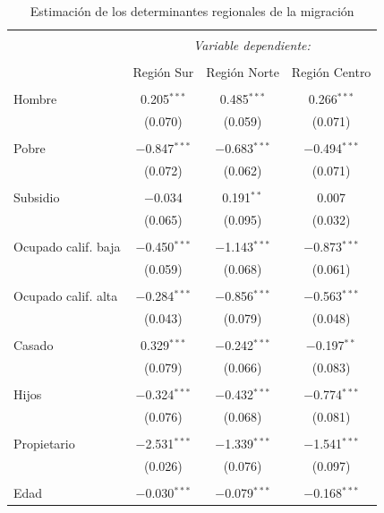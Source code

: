 \documentclass[12pt,a4paper]{article}
\begin{document}
\begin{table}[!htbp] \centering \footnotesize 
  \caption{Estimación de los determinantes regionales de la migración} 
  \label{cuadro:estimacion_regional} 
\begin{tabular}{@{\extracolsep{5pt}}lccc} 
\\[-1.8ex]\hline 
\hline \\[-1.8ex] 
 & \multicolumn{3}{c}{\textit{Variable dependiente:}} \\ 
\cline{2-4} 
\\[-1.8ex] & Región Sur & Región Norte & Región Centro \\ 
\hline \\[-1.8ex] 
 Hombre & 0.205$^{***}$ & 0.485$^{***}$ & 0.266$^{***}$ \\ 
  & (0.070) & (0.059) & (0.071) \\ 
  & & & \\ 
 Pobre & $-$0.847$^{***}$ & $-$0.683$^{***}$ & $-$0.494$^{***}$ \\ 
  & (0.072) & (0.062) & (0.071) \\ 
  & & & \\ 
 Subsidio & $-$0.034 & 0.191$^{**}$ & 0.007 \\ 
  & (0.065) & (0.095) & (0.032) \\ 
  & & & \\ 
 Ocupado calif. baja & $-$0.450$^{***}$ & $-$1.143$^{***}$ & $-$0.873$^{***}$ \\ 
  & (0.059) & (0.068) & (0.061) \\ 
  & & & \\ 
 Ocupado calif. alta & $-$0.284$^{***}$ & $-$0.856$^{***}$ & $-$0.563$^{***}$ \\ 
  & (0.043) & (0.079) & (0.048) \\ 
  & & & \\ 
 Casado & 0.329$^{***}$ & $-$0.242$^{***}$ & $-$0.197$^{**}$ \\ 
  & (0.079) & (0.066) & (0.083) \\ 
  & & & \\ 
 Hijos & $-$0.324$^{***}$ & $-$0.432$^{***}$ & $-$0.774$^{***}$ \\ 
  & (0.076) & (0.068) & (0.081) \\ 
  & & & \\ 
 Propietario & $-$2.531$^{***}$ & $-$1.339$^{***}$ & $-$1.541$^{***}$ \\ 
  & (0.026) & (0.076) & (0.097) \\ 
  & & & \\ 
 Edad & $-$0.030$^{***}$ & $-$0.079$^{***}$ & $-$0.168$^{***}$ \\ 

\end{tabular}
\end{table}
\end{document}
